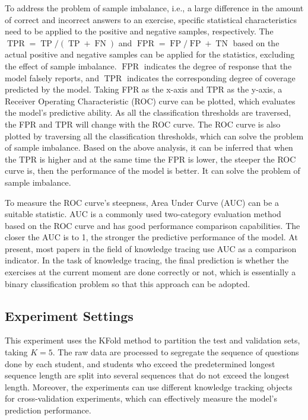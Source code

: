 To address the problem of sample imbalance, i.e., a large difference in the amount of correct and incorrect answers to an exercise, specific statistical characteristics need to be applied to the positive and negative samples, respectively. The \(\operatorname{TPR}=\operatorname{TP}/(\operatorname{TP}+\operatorname{FN})\) and \(\operatorname{FPR}=\operatorname{FP}/\operatorname{FP}+\operatorname{TN}\) based on the actual positive and negative samples can be applied for the statistics, excluding the effect of sample imbalance. \(\operatorname{FPR}\) indicates the degree of response that the model falsely reports, and \(\operatorname{TPR}\) indicates the corresponding degree of coverage predicted by the model. Taking FPR as the x-axis and TPR as the y-axis, a Receiver Operating Characteristic (ROC) curve can be plotted, which evaluates the model's predictive ability. As all the classification thresholds are traversed, the FPR and TPR will change with the ROC curve. The ROC curve is also plotted by traversing all the classification thresholds, which can solve the problem of sample imbalance. Based on the above analysis, it can be inferred that when the TPR is higher and at the same time the FPR is lower, the steeper the ROC curve is, then the performance of the model is better. It can solve the problem of sample imbalance.


To measure the ROC curve's steepness, Area Under Curve (AUC) can be a suitable statistic. AUC is a commonly used two-category evaluation method based on the ROC curve and has good performance comparison capabilities. The closer the AUC is to 1, the stronger the predictive performance of the model. At present, most papers in the field of knowledge tracing use AUC as a comparison indicator. In the task of knowledge tracing, the final prediction is whether the exercises at the current moment are done correctly or not, which is essentially a binary classification problem so that this approach can be adopted.

\subsection{Experiment Settings}
This experiment uses the KFold method to partition the test and validation sets, taking \(K=5\). The raw data are processed to segregate the sequence of questions done by each student, and students who exceed the predetermined longest sequence length are split into several sequences that do not exceed the longest length. Moreover, the experiments can use different knowledge tracking objects for cross-validation experiments, which can effectively measure the model's prediction performance.

